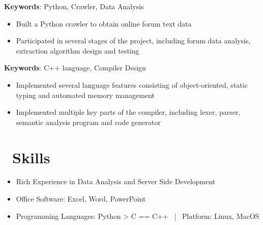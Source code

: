 \documentclass{resume}
\begin{document}
\textbf{Keywords}: Python, Crawler, Data Analysis
\begin{itemize}
  \item Built a Python crawler to obtain online forum text data
  \item Participated in several stages of the project, including forum data analysis, extraction algorithm design and testing
\end{itemize}

\textbf{Keywords}: C++ language, Compiler Design
\begin{itemize}
  \item Implemented several language features consisting of object-oriented, static typing and automated memory management
  \item Implemented multiple key parts of the compiler, including lexer, parser, semantic analysis program and code generator
\end{itemize}


\section{\faCogs\ Skills}
\begin{itemize}[parsep=0.5ex]
  \item Rich Experience in Data Analysis and Server Side Development
  \item Office Software: Excel, Word, PowerPoint
  \item Programming Languages: Python > C == C++ \ | \ Platform: Linux, MacOS
\end{itemize}


%
%
\end{document}
